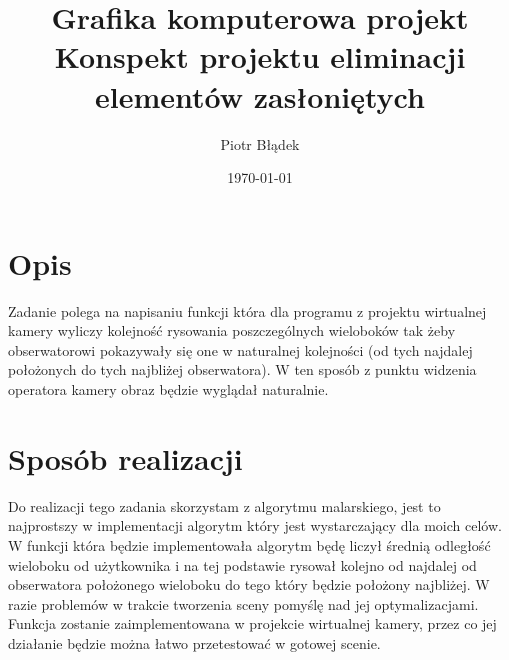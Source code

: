 \documentclass[a4paper,11pt,notitlepage]{article}
\author{Piotr Błądek}
\title{Grafika komputerowa projekt \\ Konspekt projektu eliminacji elementów zasłoniętych}
\date{\today}
\begin{document}
\maketitle

\section{Opis}
\noindent
Zadanie polega na napisaniu funkcji która dla programu z projektu wirtualnej kamery wyliczy kolejność rysowania poszczególnych wieloboków tak żeby obserwatorowi pokazywały się one w naturalnej kolejności (od tych najdalej położonych do tych najbliżej obserwatora). W ten sposób z punktu widzenia operatora kamery obraz będzie wyglądał naturalnie.

\section{Sposób realizacji}
\noindent
Do realizacji tego zadania skorzystam z algorytmu malarskiego, jest to najprostszy w implementacji algorytm który jest wystarczający dla moich celów. W funkcji która będzie implementowała algorytm będę liczył średnią odległość wieloboku od użytkownika i na tej podstawie rysował kolejno od najdalej od obserwatora położonego wieloboku do tego który będzie położony najbliżej. W razie problemów w trakcie tworzenia sceny pomyślę nad jej optymalizacjami. \newline
Funkcja zostanie zaimplementowana w projekcie wirtualnej kamery, przez co jej działanie będzie można łatwo przetestować w gotowej scenie.
\end{document}
